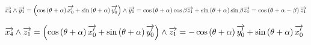 \documentclass[10pt,fleqn]{article} %
\begin{document}
$\overrightarrow{x_4} \wedge \overrightarrow{y_1} = \left( \cos \left(\theta + \alpha \right)\overrightarrow{x_0'} + \sin \left(\theta + \alpha \right)\overrightarrow{y_0'} \right)\wedge \overrightarrow{y_1}
=  \cos \left(\theta + \alpha \right)\cos\beta\overrightarrow{z_1} + \sin \left(\theta + \alpha \right)\sin \beta  \overrightarrow{z_1}
=  \cos \left(\theta + \alpha -\beta\right)\overrightarrow{z_1}$

$\overrightarrow{x_4} \wedge \overrightarrow{z_1} = \left( \cos \left(\theta + \alpha \right)\overrightarrow{x_0'} + \sin \left(\theta + \alpha \right)\overrightarrow{y_0'} \right)\wedge \overrightarrow{z_1} 
=  -\cos \left(\theta + \alpha \right)\overrightarrow{y_0'} + \sin \left(\theta + \alpha \right)\overrightarrow{x_0'}$
\end{document}
